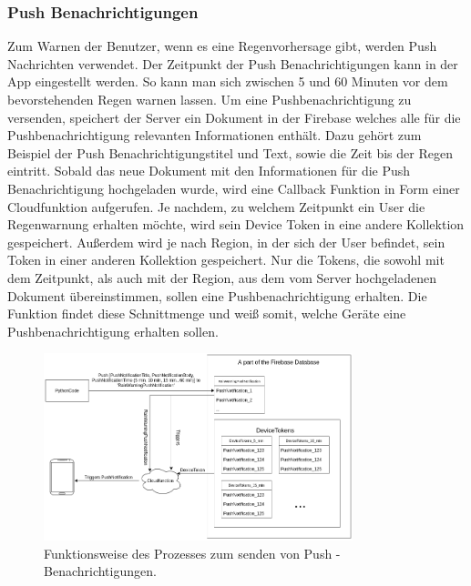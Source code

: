 \subsubsection{Push Benachrichtigungen}\label{sec:Pushbenachrichtigungen}
Zum Warnen der Benutzer, wenn es eine Regenvorhersage gibt, werden Push Nachrichten verwendet. 
Der Zeitpunkt der Push Benachrichtigungen kann in der App eingestellt werden. 
So kann man sich zwischen 5 und 60 Minuten vor dem bevorstehenden Regen warnen lassen.  
Um eine Pushbenachrichtigung zu versenden, speichert der Server ein Dokument in der Firebase welches alle für die 
Pushbenachrichtigung relevanten Informationen enthält. 
Dazu gehört zum Beispiel der Push Benachrichtigungstitel und Text, sowie die Zeit bis der Regen eintritt.
Sobald das neue Dokument mit den Informationen für die Push Benachrichtigung hochgeladen wurde, wird eine Callback 
Funktion in Form einer Cloudfunktion aufgerufen.
Je nachdem, zu welchem Zeitpunkt ein User die Regenwarnung erhalten möchte, wird sein Device Token in eine andere 
Kollektion gespeichert.   
Außerdem wird je nach Region, in der sich der User befindet, sein Token in einer anderen Kollektion gespeichert. 
Nur die Tokens, die sowohl mit dem Zeitpunkt, als auch mit der Region, aus dem vom Server hochgeladenen Dokument übereinstimmen, 
sollen eine Pushbenachrichtigung erhalten. 
Die Funktion findet diese Schnittmenge und weiß somit, welche Geräte eine Pushbenachrichtigung erhalten sollen.

\begin{figure}[H]
 \centering
 \includegraphics[width=0.8\textwidth,angle=0]{abb/funktionsweise_pushnachrichten_senden}
 \caption[Funktionsweise von Pushbenachrichtigungen]{Funktionsweise des Prozesses zum senden von Push - Benachrichtigungen.}
\label{fig:funktionsweise_pushnachrichten_senden}
\end{figure}

